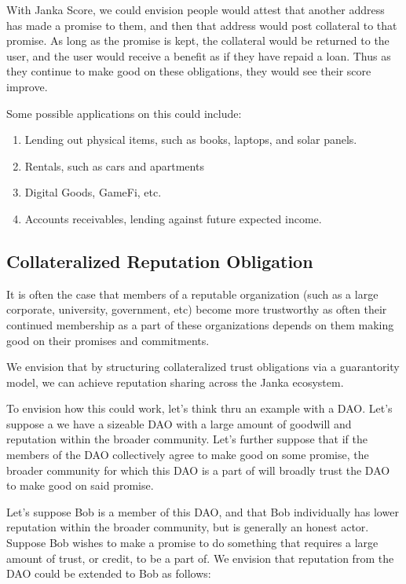\documentclass{article}
\begin{document}
With Janka Score, we could envision people would attest that another address has made a promise to them, and then that address would post collateral to that promise. As long as the promise is kept, the collateral would be returned to the user, and the user would receive a benefit as if they have repaid a loan. Thus as they continue to make good on these obligations, they would see their score improve.

Some possible applications on this could include:
\begin{enumerate}
    \item Lending out physical items, such as books, laptops, and solar panels.
    \item Rentals, such as cars and apartments 
    \item Digital Goods, GameFi, etc.
    \item Accounts receivables, lending against future expected income.
\end{enumerate}


\subsection{Collateralized Reputation Obligation}

It is often the case that members of a reputable organization (such as a large corporate, university, government, etc) become more trustworthy as often their continued membership as a part of these organizations depends on them making good on their promises and commitments.

We envision that by structuring collateralized trust obligations via a guarantority model, we can achieve reputation sharing across the Janka ecosystem.

To envision how this could work, let's think thru an example with a DAO. Let's suppose a we have a sizeable DAO with a large amount of goodwill and reputation within the broader community. Let's further suppose that if the members of the DAO collectively agree to make good on some promise, the broader community for which this DAO is a part of will broadly trust the DAO to make good on said promise. 

Let's suppose Bob is a member of this DAO, and that Bob individually has lower reputation within the broader community, but is generally an honest actor. Suppose Bob wishes to make a promise to do something that requires a large amount of trust, or credit, to be a part of. We envision that reputation from the DAO could be extended to Bob as follows:
\end{document}
